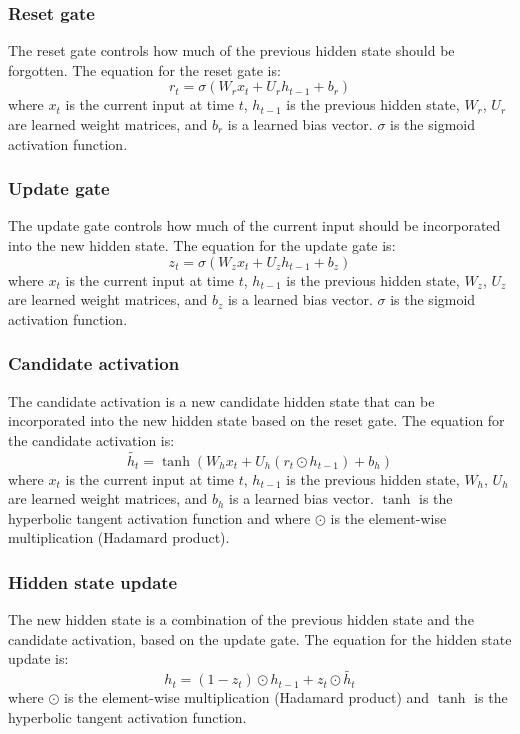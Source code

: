 \documentclass[a4paper, noexaminfo]{sapthesis}
\begin{document}
\subsubsection{Reset gate}
The reset gate controls how much of the previous hidden state should be 
forgotten. The equation for the reset gate is:
\begin{equation}
  r_t = \sigma(W_r x_t + U_r h_{t-1} + b_r)
  \end{equation}
where $x_t$ is the current input at time $t$, $h_{t-1}$ is the previous
  hidden state, $W_r$, $U_r$ are learned weight matrices, and $b_r$ is a 
  learned bias vector. $\sigma$ is the sigmoid activation function.
\subsubsection{Update gate}
The update gate controls how much of the current input 
should be incorporated into the new hidden state. The equation for the
  update gate is:
\begin{equation}
  z_t = \sigma(W_z x_t + U_z h_{t-1} + b_z)
  \end{equation}
where $x_t$ is the current input at time $t$, $h_{t-1}$ is the previous
  hidden state, $W_z$, $U_z$ are learned weight matrices, and $b_z$ is a 
  learned bias vector. $\sigma$ is the sigmoid activation function.
\subsubsection{Candidate activation}
The candidate activation is a new candidate hidden state that can be
  incorporated into the new hidden state based on the reset gate. The
    equation for the candidate activation is:
\begin{equation}
  \tilde{h_t} = \tanh(W_h x_t + U_h (r_t \odot h_{t-1}) + b_h)
  \end{equation}
where $x_t$ is the current input at time $t$, $h_{t-1}$ is the previous
  hidden state, $W_h$, $U_h$ are learned weight matrices, and $b_h$ is a 
  learned bias vector. $\tanh$ is the hyperbolic tangent activation 
  function and where $\odot$ is the element-wise multiplication 
  (Hadamard product).
\subsubsection{Hidden state update}
The new hidden state is a combination of the previous hidden state and
  the candidate activation, based on the update gate. The equation for
    the hidden state update is:
\begin{equation}
  h_t = (1 - z_t) \odot h_{t-1} + z_t \odot \tilde{h_t}
  \end{equation}
where $\odot$ is the element-wise multiplication (Hadamard product) and 
$\tanh$ is the hyperbolic tangent activation function. 
\end{document}
